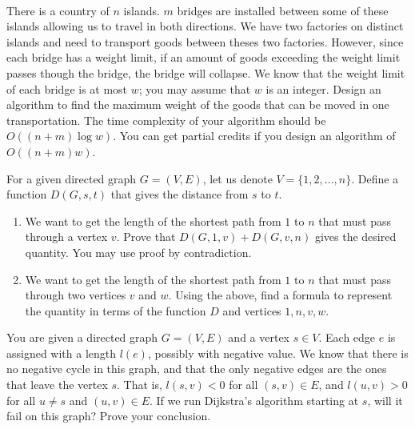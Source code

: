 \documentclass[11pt]{article}
\begin{document}
\begin{qunlist}
\begin{tikzpicture}[>=stealth',shorten >=1pt,node distance=3cm,on grid,initial/.style    ={}]
\end{tikzpicture}\\

There is a country of $n$ islands. $m$ bridges are installed between some of
these islands allowing us to travel in both directions.  We have two factories
on distinct islands and need to transport goods between theses two factories.
However, since each bridge has a weight limit, if an amount of goods exceeding
the weight limit passes though the bridge, the bridge will collapse. We know
that the weight limit of each bridge is at most $w$; you may assume that $w$ is an integer.
Design an algorithm to
find the maximum weight of the goods that can be moved in one transportation.
The time complexity of your algorithm should be $O((n + m) \log w)$. You can
get partial credits if you design an algorithm of $O((n + m)w)$.

For a given directed graph $G = (V, E)$, let us denote $V = \{1, 2, ..., n\}$.
Define a function $D(G, s, t)$ that gives the distance from $s$ to $t$.

\begin{enumerate}
    \item We want to get the length of the shortest path from $1$ to $n$ that must pass through a vertex $v$. 
	Prove that $D(G, 1, v) + D(G, v, n)$ gives the desired quantity. You may use proof by contradiction.
    \item We want to get the length of the shortest path from $1$ to $n$ that must pass through two vertices $v$ and $w$. 
	Using the above, find a formula to represent the quantity in terms of the function $D$ and vertices $1, n, v, w$.
\end{enumerate}


 You are given a directed graph $G = (V,E)$ and a vertex $s\in V$. Each edge $e$ is assigned with a length $l(e)$, possibly with negative value. We know that there is no negative cycle in this graph, and that the only negative edges are the ones that leave the vertex $s$. That is, $l(s, v) < 0$ for all $(s, v) \in E$, and $l(u,v) > 0$ for all $u\neq s$ and $(u,v)\in E$. If we run Dijkstra’s algorithm starting at $s$, will it fail on this graph? Prove your conclusion.


\end{qunlist}
\end{document}
